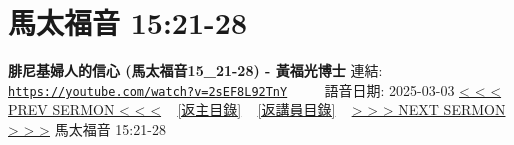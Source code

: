 \documentclass{book}
\begin{document}
\section{馬太福音 15:21-28}
\label{sec:2sEF8L92TnY}
\textbf{腓尼基婦人的信心 (馬太福音15\_21-28) - 黃福光博士}
\newline
\newline
連結: \href{https://youtube.com/watch?v=2sEF8L92TnY}{\texttt{https://youtube.com/watch?v=2sEF8L92TnY}} ~~~~ 語音日期: 2025-03-03
\newline
\newline
\hyperref[sec:kQPRWjuPxwQ]{< < < PREV SERMON < < <}
~
\hyperlink{toc}{[返主目錄]}
~
\hyperref[ch:preacher17]{[返講員目錄]}
~
\hyperref[sec:g49XieTOO9Y]{> > > NEXT SERMON > > >}
\newline
\newline
馬太福音 15:21-28
\newline
\end{document}
